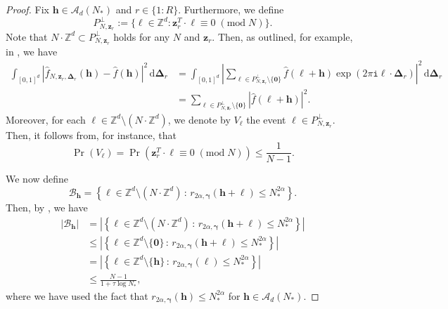 \documentclass[pdflatex,sn-basic,Numbered]{sn-jnl}%
\newcommand{\rd}{\, \mathrm{d}}
\newcommand{\bszero}{\boldsymbol{0}}
\newcommand{\bsh}{\boldsymbol{h}}
\newcommand{\bsl}{\boldsymbol{\ell}}
\newcommand{\bsz}{\boldsymbol{z}}
\newcommand{\bsgamma}{\boldsymbol{\gamma}}
\newcommand{\bsDelta}{\boldsymbol{\Delta}}
\newcommand{\ZZ}{\mathbb{Z}}
\newcommand{\Acal}{\mathcal{A}}
\newcommand{\tmod}[1]{{\;(\text{mod}\; #1)}}
\newcommand{\icomp}{\mathtt{i}}
\newcommand{\abs}[1]{\left\vert#1\right\vert}
\theoremstyle{thmstyleone}%
\theoremstyle{thmstyletwo}%
\begin{document}
\begin{proof}
Fix $\bsh\in\Acal_d (N_*)$ and $r\in\{1{:}R\}$. Furthermore, we define
\[ P_{N,\boldsymbol{z}_r}^\perp:=\{\bsl\in \ZZ^d : \bsz^T_r\cdot\bsl\equiv 0 \tmod N\}.\]
Note that $N\cdot \ZZ^d \subset P_{N,\boldsymbol{z}_r}^\perp$ holds for any $N$ and $\bsz_r$.
Then, as outlined, for example, in \cite[Proof of Lemma 4.1]{CGK24}, we have
\begin{align}
    \int_{[0,1]^d} |\widehat{f}_{N,\bsz_r,\bsDelta_r}(\bsh)-\widehat{f}(\bsh)|^2 \rd\bsDelta_r &  = \int_{[0,1]^d} \abs{\sum_{\bsl \in P_{N,\boldsymbol{z}_r}^\perp\setminus \{\bszero\}}\widehat{f}(\bsl+\bsh) \exp(2\pi\icomp \bsl\cdot\bsDelta_r)}^2\rd\bsDelta_r\nonumber\\
    & =\sum_{\bsl \in P_{N,\boldsymbol{z}_r}^\perp\setminus \{\bszero\}}|\widehat{f}(\bsl+\bsh)|^2.\label{eqn:deltamean}
\end{align}
Moreover, for each $\bsl\in\ZZ^d\setminus (N\cdot \ZZ^d)$, we denote by $V_{\bsl}$ the event $\bsl \in P_{N,\boldsymbol{z}_r}^\perp$. 
Then, it follows from, for instance, \cite[Lemma~4]{kritzer2019lattice} that
\[ 
\Pr(V_{\bsl})=\Pr(\bsz^T_r\cdot\bsl\equiv 0 \tmod N )\leq \frac{1}{N-1}.
\]

We now define 
\[
\mathcal{B}_{\bsh}=\left\{ \bsl \in \ZZ^d\setminus (N\cdot \ZZ^d)\, \colon\, r_{2\alpha, \bsgamma}(\bsh+\bsl)\leq N_*^{2\alpha}\right\}.
\]
Then, by , we have
\begin{align*}
|\mathcal{B}_{\bsh}| & =
\left|\left\{ \bsl \in\ZZ^d\setminus (N\cdot \ZZ^d)\, \colon \, r_{2\alpha, \bsgamma}(\bsh + \bsl) \leq N_*^{2\alpha} \right\}\right|\\
& \le \left|\left\{ \bsl \in\ZZ^d\setminus \{\bszero\}\, \colon \, r_{2\alpha, \bsgamma}(\bsh + \bsl) \leq N_*^{2\alpha} \right\}\right| \\
& = \left|\left\{ \bsl \in \ZZ^d\setminus \{\bsh\} \, \colon \, r_{2\alpha, \bsgamma}(\bsl) \leq N_*^{2\alpha}\right\}\right|\\
&\le \frac{N-1}{1+\tau\log N_*},
\end{align*}
where we have used the fact that $r_{2\alpha, \bsgamma}(\bsh) \leq N_*^{2\alpha}$ for $\bsh\in \Acal_d(N_*)$.


\end{proof}
\end{document}
